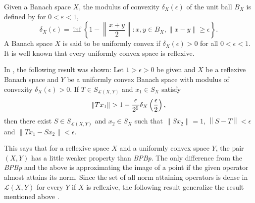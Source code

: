\documentclass[a4paper]{amsart}
\theoremstyle{plain}
\theoremstyle{definition}
\begin{document}
Given a Banach space $X$, the modulus of convexity $\delta_X(\epsilon)$ of the unit ball $B_X$ is defined by for $0<{\varepsilon}<1$,
\[ \delta_X(\epsilon) = \inf \left\{ 1-\left\| \frac{x+y}2 \right\|:  x , y\in B_X, \|x-y\|{\geqslant} \epsilon \right\}. \]
A Banach space $X$ is said to be uniformly convex if $\delta_X(\epsilon)>0$ for all $0<\epsilon<1$. It is well known that every uniformly convex space is reflexive.

In \cite{Kim}, the following result was shown:
Let $1>\epsilon>0$ be given and $X$ be a reflexive Banach space and $Y$ be a uniformly convex Banach space with modulus of convexity $\delta_X\left(\epsilon\right)>0$. If $T\in S_{\mathcal{L}\left(X,Y\right)}$ and $x_1\in S_X$ satisfy $$\left\|Tx_1\right\|>1-{{\epsilon}\over{ 2^5}}\delta_X\left({{\epsilon}\over{2}}\right),$$ then there exist $S\in S_{\mathcal{L}\left(X,Y\right)}$ and $x_2\in S_X$ such that $\left\|Sx_2\right\|=1$, $\left\|S-T\right\|<\epsilon$ and $\left\|Tx_1-Sx_2\right\|<\epsilon$.

     This says that for a reflexive space $X$ and  a uniformly convex space $Y$, the pair $(X,Y)$ has a little weaker property than \emph{BPBp}. The only difference from the \emph{BPBp} and the above is approximating the image of a point if the given operator almost attains its norm.  Since the set of all norm attaining operators is dense in $\mathcal{L}(X,Y)$ for every $Y$ if $X$ is reflexive, the following result generalize the result mentioned above \cite{Kim}.
\end{document}
